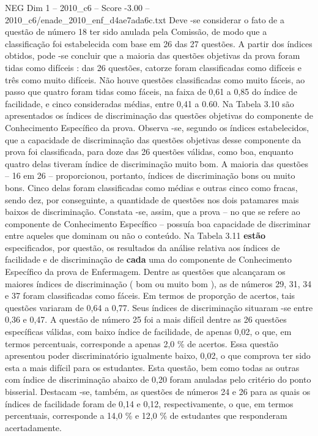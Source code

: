 \begin{textsample}{NEG Dim 1 – 2010\_c6 – Score -3.00 – 2010\_c6/enade\_2010\_enf\_d4ae7ada6c.txt}
Deve -se considerar o fato de a questão de número 18 ter sido anulada pela Comissão, de modo que a classificação foi estabelecida com base em 26 das 27 questões.
A partir dos índices obtidos, pode -se concluir que a maioria das questões objetivas da prova foram tidas como difíceis : das 26 questões, catorze foram classificadas como difíceis e três como muito difíceis.
Não houve questões classificadas como muito fáceis, ao passo que quatro foram tidas como fáceis, na faixa de 0,61 a 0,85 do índice de facilidade, e cinco consideradas médias, entre 0,41 a 0.60.
Na Tabela 3.10 são apresentados os índices de discriminação das questões objetivas do componente de Conhecimento Específico da prova.
Observa -se, segundo os índices estabelecidos, que a capacidade de discriminação das questões objetivas desse componente da prova foi classificada, para doze das 26 questões válidas, como boa, enquanto quatro delas tiveram índice de discriminação muito bom.
A maioria das questões – 16 em 26 – proporcionou, portanto, índices de discriminação bons ou muito bons.
Cinco delas foram classificadas como médias e outras cinco como fracas, sendo dez, por conseguinte, a quantidade de questões nos dois patamares mais baixos de discriminação.
Constata -se, assim, que a prova – no que se refere ao componente de Conhecimento Específico – possuía boa capacidade de discriminar entre aqueles que dominam ou não o conteúdo.
Na Tabela 3.11 \textbf{estão} especificados, por questão, os resultados da análise relativa aos índices de facilidade e de discriminação de \textbf{cada} uma do componente de Conhecimento Específico da prova de Enfermagem.
Dentre as questões que alcançaram os maiores índices de discriminação ( bom ou muito bom ), as de números 29, 31, 34 e 37 foram classificadas como fáceis.
Em termos de proporção de acertos, tais questões variaram de 0,64 a 0,77.
Seus índices de discriminação situaram -se entre 0,36 e 0,47.
A questão de número 25 foi a mais difícil dentre as 26 questões específicas válidas, com baixo índice de facilidade, de apenas 0,02, o que, em termos percentuais, corresponde a apenas 2,0 \% de acertos.
Essa questão apresentou poder discriminatório igualmente baixo, 0,02, o que comprova ter sido esta a mais difícil para os estudantes.
Esta questão, bem como todas as outras com índice de discriminação abaixo de 0,20 foram anuladas pelo critério do ponto bisserial.
Destacam -se, também, as questões de números 24 e 26 para as quais os índices de facilidade foram de 0,14 e 0,12, respectivamente, o que, em termos percentuais, corresponde a 14,0 \% e 12,0 \% de estudantes que responderam acertadamente.

\end{textsample}
